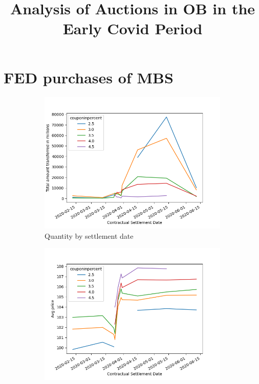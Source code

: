 \documentclass[11pt,a4paper]{article}
\begin{document}
\title{Analysis of Auctions in OB in the Early Covid Period}

\maketitle



\section{FED purchases of MBS}

\begin{figure}[h]
    \centering
    \begin{subfigure}[b]{0.49\textwidth}
        \includegraphics[width=0.998\textwidth]{../results/figures/FNMA_daily_purchases_contractualsettlementdate_amount.png}
        \caption{ Quantity by settlement date}
       \end{subfigure}
       \begin{subfigure}[b]{0.49\textwidth}
        \includegraphics[width=0.998\textwidth]{../results/figures/FNMA_daily_purchases_contractualsettlementdate_price.png}

\end{subfigure}
\end{figure}
\end{document}
